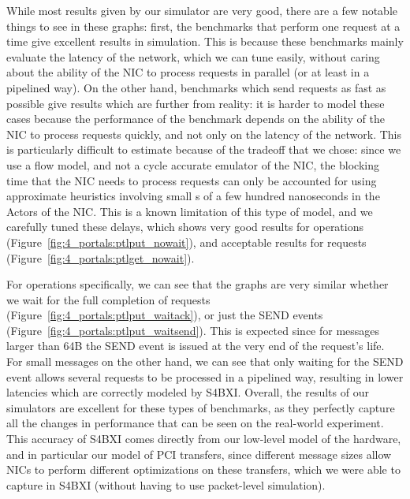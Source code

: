While most results given by our simulator are very good, there are a few notable
things to see in these graphs: first, the benchmarks that perform one request at
a time give excellent results in simulation. This is because these benchmarks
mainly evaluate the latency of the network, which we can tune easily, without
caring about the ability of the NIC to process requests in parallel (or at least
in a pipelined way). On the other hand, benchmarks which send requests as fast
as possible give results which are further from reality: it is harder to model
these cases because the performance of the benchmark depends on the ability of
the NIC to process requests quickly, and not only on the latency of the network.
This is particularly difficult to estimate because of the tradeoff that we
chose: since we use a flow model, and not a cycle accurate emulator of the NIC,
the blocking time that the NIC needs to process requests can only be accounted
for using approximate heuristics involving small s of a few
hundred nanoseconds in the Actors of the NIC. This is a known limitation of this
type of model, and we carefully tuned these delays, which shows very good
results for  operations
(Figure~\ref{fig:4_portals:ptlput_nowait}), and acceptable results for
 requests (Figure~\ref{fig:4_portals:ptlget_nowait}).

For  operations specifically, we can see that the graphs are very
similar whether we wait for the full completion of requests
(Figure~\ref{fig:4_portals:ptlput_waitack}), or just the SEND events
(Figure~\ref{fig:4_portals:ptlput_waitsend}). This is expected since for
messages larger than 64B the SEND event is issued at the very end of the
request's life. For small messages on the other hand, we can see that only
waiting for the SEND event allows several requests to be processed in a
pipelined way, resulting in lower latencies which are correctly modeled by
S4BXI. Overall, the results of our simulators are excellent for these types of
benchmarks, as they perfectly capture all the changes in performance that can be
seen on the real-world experiment. This accuracy of S4BXI comes directly from
our low-level model of the hardware, and in particular our model of PCI
transfers, since different message sizes allow NICs to perform different
optimizations on these transfers, which we were able to capture in S4BXI
(without having to use packet-level simulation).

